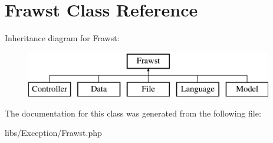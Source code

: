 \hypertarget{classFrawst}{
\section{Frawst Class Reference}
\label{classFrawst}
}
Inheritance diagram for Frawst:\begin{figure}[H]
\begin{center}
\leavevmode
\includegraphics[height=2.000000cm]{classFrawst}
\end{center}
\end{figure}


The documentation for this class was generated from the following file:\begin{DoxyCompactItemize}
\item 
libs/Exception/Frawst.php\end{DoxyCompactItemize}
